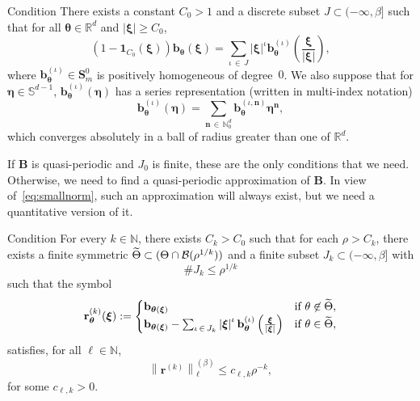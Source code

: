 \documentclass[AHL,Unicode,longabstracts,published]{cedram}
\newcommand{\R}{\mathbb R}
\newcommand{\N}{\mathbb N}
\newcommand{\BBS}{\mathbb S}
\newcommand{\CB}{\mathcal{B}}
\newcommand{\btheta}{\boldsymbol \theta}
\newcommand{\bxi}{\boldsymbol \xi}
\newcommand{\boeta}{\boldsymbol \eta}
\newcommand{\bone}{\boldsymbol 1}
\newcommand{\BB}{\mathbf B}
\newcommand{\BS}{\mathbf S}
\newcommand{\bbb}{\mathbf b}
\newcommand{\br}{\mathbf r}
\newcommand{\bn}{\mathbf n}
\newcommand{\abs}[1]{\left\lvert #1 \right\rvert}
\newcommand{\snorm}[3]{\left\| #1\right\|_{#3}^{(#2)}}
\let\oldtilde\tilde
\renewcommand*{\tilde}[1]{\mathchoice{\widetilde{#1}}{\widetilde{#1}}{\oldtilde{#1}}{\oldtilde{#1}}}
\begin{document}
\begin{enonce}
{Condition}\label{condII}
There exists a constant $C_0 > 1$ and a discrete subset $J \subset (-\infty,\beta]$ such that for all $\btheta \in \R^d$ and $\abs \bxi \ge C_0$,
\begin{equation}
(1 - \bone_{C_0}(\bxi)) \bbb_{\btheta}(\bxi) = \sum_{\iota\,\in\,J}
\abs{\bxi}^\iota
\bbb_{\btheta}^{(\iota)}\left(\frac{\bxi}{\abs \bxi} \right),
\end{equation}
where $\bbb_{\btheta}^{(\iota)} \in \BS_m^0$ is positively homogeneous of degree~$0$. We also suppose that for $\boeta \in \BBS^{d-1}$, $\bbb_{\btheta}^{(\iota)}(\boeta)$ has a series representation (written in multi-index notation)
\begin{equation}
\bbb_{\btheta}^{(\iota)}(\boeta) = \sum_{\bn\,\in\,\N_0^d}
\bbb_{\btheta}^{(\iota,\bn)} \boeta^\bn,
\end{equation}
which converges absolutely in a ball of radius greater than one of $\R^d$.
\end{enonce}

If $\BB$ is quasi-periodic and $J_0$ is finite, these are the only conditions that we need. Otherwise, we need to find a quasi-periodic approximation of $\BB$. In view of~\eqref{eq:smallnorm}, such an approximation will always exist, but we need a quantitative version of it.

\begin{enonce}
{Condition}\label{condIII}
For every $k \in \N$, there exists $C_k > C_0$ such that for each $\rho > C_k$, there exists a finite symmetric $\tilde \Theta \subset (\Theta \cap \CB(\rho^{1/k}))$ and a finite subset $J_k
\subset (-\infty,\beta]$ with
\begin{equation}\label{eq:cardtildej}
\# J_k \le \rho^{1/k}
\end{equation}
such that the symbol
\begin{equation}\label{eq:symbolrb2}
\br_{\btheta}^{(k)}(\bxi) :=
\begin{cases}
\bbb_{\btheta(\bxi)} & \text{if } \theta \not \in \tilde \Theta, \\
\bbb_{\btheta(\bxi)} - \sum_{\iota\,\in\,J_k} \abs{\bxi}^{\iota}
\bbb_{\btheta}^{(\iota)}\left(\frac{\bxi}{\abs \bxi} \right) & \text{if } \theta \in \tilde \Theta,
\end{cases}
\end{equation}
satisfies, for all $\ell \in \N$,
\begin{equation}\label{eq:smallseminorm}
\snorm{\br^{(k)}}{\beta}{\ell} \le c_{\ell,k} \rho^{-k},
\end{equation}
for some $c_{\ell,k} > 0$.
\end{enonce}
\end{document}
